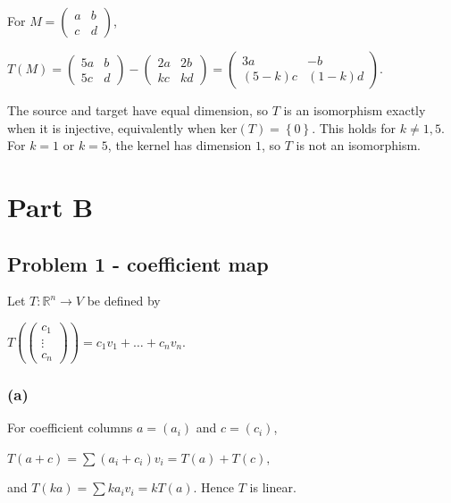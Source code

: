 For \(M = \begin{pmatrix}
a & b \\
c & d
\end{pmatrix}\),

\(T(M) = \begin{pmatrix}
{5a} & b \\
{5c} & d
\end{pmatrix} - \begin{pmatrix}
{2a} & {2b} \\
{kc} & {kd}
\end{pmatrix} = \begin{pmatrix}
{3a} & {- b} \\
{\left( {5 - k} \right)c} & {\left( {1 - k} \right)d}
\end{pmatrix}.\)

The source and target have equal dimension, so \(T\) is an isomorphism exactly when it is injective, equivalently when \(\text{ker}(T) = \left\{ 0 \right\}\). This holds for \(k \neq 1,5\). For \(k = 1\) or \(k = 5\), the kernel has dimension \(1\), so \(T\) is not an isomorphism.

\section{Part B}

\subsection{Problem 1 - coefficient map}

Let \(T:\mathbb{R}^{n}\rightarrow V\) be defined by

\(T\left( \begin{pmatrix}
c_{1} \\
\vdots \\
c_{n}
\end{pmatrix} \right) = c_{1}v_{1} + \ldots + c_{n}v_{n}.\)

\subsubsection{(a)}

For coefficient columns \(a = \left( a_{i} \right)\) and \(c = \left( c_{i} \right)\),

\(T\left( {a + c} \right) = \sum\left( {a_{i} + c_{i}} \right)v_{i} = T(a) + T(c),\)

and \(T\left( {ka} \right) = \sum ka_{i}v_{i} = kT(a)\). Hence \(T\) is linear.

